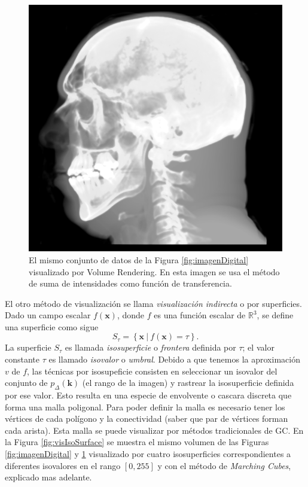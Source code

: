 \begin{figure}[htp]
 \centering
  \includegraphics[scale=0.5]{img/cap01/volRender}
  \caption[El mismo conjunto de datos de la Figura \ref{fig:imagenDigital} visualizado por Volume Rendering]{El mismo conjunto de datos de la Figura \ref{fig:imagenDigital} visualizado por Volume Rendering. En esta imagen se usa el método de suma de intensidades como función de transferencia.}
  \label{fig:volRender}
\end{figure}

El otro método de visualización se llama \emph{visualización indirecta} o por superficies. Dado un campo escalar $f(\textbf{x})$, donde $f$ es una función escalar de $\mathbb{R}^3$, se define una superficie como sigue
\begin{equation}
S_{\tau} = \left\lbrace \textbf{x} \: | \: f(\textbf{x}) = \tau \right\rbrace 
 \label{ec:isosupeficie}.
\end{equation}
La superficie $S_{\tau}$ es llamada \emph{isosuperficie} o \emph{frontera} definida por $\tau$; el valor constante $\tau$ es llamado \emph{isovalor} o \emph{umbral}. Debido a que tenemos la aproximación $v$ de $f$, las técnicas por isosupeficie consisten en seleccionar un isovalor del conjunto de $p_{\Delta}(\textbf{k})$ (el rango de la imagen)  y rastrear la isosuperficie definida por ese valor. Esto resulta en una especie de envolvente o cascara discreta que forma una malla poligonal. Para poder definir la malla es necesario tener los vértices de cada polígono y la conectividad (saber que par de vértices forman cada arista). Esta malla se puede visualizar por métodos tradicionales de GC. En la Figura \ref{fig:visIsoSurface} se muestra el mismo volumen de las Figuras \ref{fig:imagenDigital} y \ref{fig:volRender} visualizado por cuatro isosuperficies correspondientes a diferentes isovalores en el rango $[0,255]$ y con el método de \emph{Marching Cubes}, explicado mas adelante.


